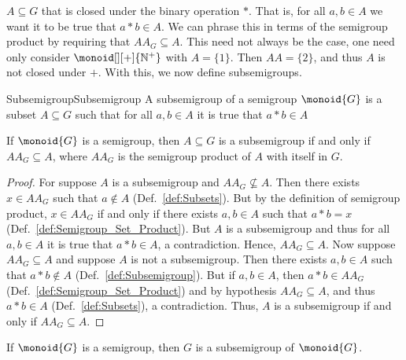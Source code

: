         $A\subseteq{G}$ that is closed under the binary operation $*$. That is,
        for all $a,b\in{A}$ we want it to be true that $a*b\in{A}$. We can
        phrase this in terms of the semigroup product by requiring that
        $AA_{G}\subseteq{A}$. This need not always be the case, one need only
        consider $\monoid[][+]{\mathbb{N}^{+}}$ with $A=\{1\}$. Then $AA=\{2\}$,
        and thus $A$ is not closed under $+$. With this, we now define
        subsemigroups.
        \begin{fdefinition}{Subsemigroup}{Subsemigroup}
            A subsemigroup of a semigroup $\monoid{G}$ is a subset
            $A\subseteq{G}$ such that for all $a,b\in{A}$ it is true that
            $a*b\in{A}$
        \end{fdefinition}
        \begin{theorem}
            \label{thm:Equiv_Def_Subsemigroup}%
            If $\monoid{G}$ is a semigroup, then $A\subseteq{G}$ is a
            subsemigroup if and only if $AA_{G}\subseteq{A}$, where $AA_{G}$ is
            the semigroup product of $A$ with itself in $G$.
        \end{theorem}
        \begin{proof}
            For suppose $A$ is a subsemigroup and $AA_{G}\nsubseteq{A}$. Then
            there exists $x\in{AA_{G}}$ such that $a\notin{A}$
            (Def.~\ref{def:Subsets}). But by the definition of semigroup
            product, $x\in{AA}_{G}$ if and only if there exists $a,b\in{A}$
            such that $a*b=x$ (Def.~\ref{def:Semigroup_Set_Product}). But $A$ is
            a subsemigroup and thus for all $a,b\in{A}$ it is true that
            $a*b\in{A}$, a contradiction. Hence, $AA_{G}\subseteq{A}$. Now
            suppose $AA_{G}\subseteq{A}$ and suppose $A$ is not a subsemigroup.
            Then there exists $a,b\in{A}$ such that $a*b\notin{A}$
            (Def.~\ref{def:Subsemigroup}). But if $a,b\in{A}$, then
            $a*b\in{AA}_{G}$ (Def.~\ref{def:Semigroup_Set_Product}) and by
            hypothesis $AA_{G}\subseteq{A}$, and thus $a*b\in{A}$
            (Def.~\ref{def:Subsets}), a contradiction. Thus, $A$ is a
            subsemigroup if and only if $AA_{G}\subseteq{A}$.
        \end{proof}
        \begin{theorem}
            \label{thm:Whole_Semigroup_is_Subsemigroup}%
            If $\monoid{G}$ is a semigroup, then $G$ is a subsemigroup of
            $\monoid{G}$.
        \end{theorem}
